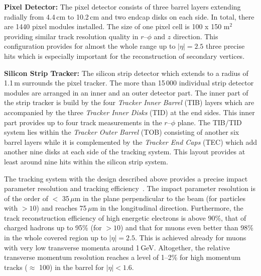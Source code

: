 \begin{description}
 \item \textbf{Pixel Detector:} The pixel detector consists of three barrel layers extending radially from 4.4\,cm to 10.2\,cm and two endcap disks on each side. In total, there are 1440 pixel modules installed. The size of one pixel cell is 100 x 150 \textmu m$^2$ providing similar track resolution quality in $r$--$\phi$ and $z$ direction. This configuration provides for almost the whole range up to $|\eta| = 2.5$ three precise hits which is especially important for the reconstruction of secondary vertices.
 \item \textbf{Silicon Strip Tracker:} The silicon strip detector which extends to a radius of 1.1\,m surrounds the pixel tracker. The more than 15\,000 individual strip detector modules are arranged in an inner and an outer detector part. The inner part of the strip tracker is build by the four \textit{Tracker Inner Barrel} (TIB) layers which are accompanied by the three \textit{Tracker Inner Disks} (TID) at the end sides. This inner part provides up to four track measurements in the $r$--$\phi$ plane. The TIB/TID system lies within the \textit{Tracker Outer Barrel} (TOB) consisting of another six barrel layers while it is complemented by the \textit{Tracker End Caps} (TEC) which add another nine disks at each side of the tracking system. This layout provides at least around nine hits within the silicon strip system. 
\end{description}
The tracking system with the design described above provides a precise impact parameter resolution and tracking efficiency~\cite{bib:cmstdr:tracker}. The impact parameter resolution is of the order of $<$ 35\,$\mu$m in the plane perpendicular to the beam (for particles with \pt$> 10$\gev) and reaches 75\,$\mu$m in the longitudinal direction. Furthermore, the track reconstruction efficiency of high energetic electrons is above 90\%, that of charged hadrons up to 95\% (for \pt$> 10$\gev) and that for muons even better than 98\% in the whole covered region up to $|\eta| = 2.5$. This is achieved already for muons with very low transverse momenta around 1\,GeV. Altogether, the relative transverse momentum resolution reaches a level of 1--2\% for high momentum tracks ($\approx$ 100\gev) in the barrel for $|\eta| < 1.6$.
 
